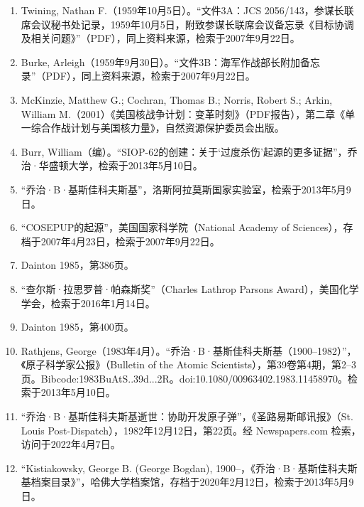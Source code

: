 \begin{enumerate}
\item Twining, Nathan F.（1959年10月5日）。“文件3A：JCS 2056/143，参谋长联席会议秘书处记录，1959年10月5日，附致参谋长联席会议备忘录《目标协调及相关问题》”（PDF），同上资料来源，检索于2007年9月22日。
\item Burke, Arleigh（1959年9月30日）。“文件3B：海军作战部长附加备忘录”（PDF），同上资料来源，检索于2007年9月22日。
\item McKinzie, Matthew G.; Cochran, Thomas B.; Norris, Robert S.; Arkin, William M.（2001）《美国核战争计划：变革时刻》（PDF报告），第二章《单一综合作战计划与美国核力量》，自然资源保护委员会出版。
\item Burr, William（编）。“SIOP-62的创建：关于‘过度杀伤’起源的更多证据”，乔治·华盛顿大学，检索于2013年5月10日。
\item “乔治·B·基斯佳科夫斯基”，洛斯阿拉莫斯国家实验室，检索于2013年5月9日。
\item “COSEPUP的起源”，美国国家科学院（National Academy of Sciences），存档于2007年4月23日，检索于2007年9月22日。
\item Dainton 1985，第386页。
\item “查尔斯·拉思罗普·帕森斯奖”（Charles Lathrop Parsons Award），美国化学学会，检索于2016年1月14日。
\item Dainton 1985，第400页。
\item Rathjens, George（1983年4月）。“乔治·B·基斯佳科夫斯基（1900–1982）”，《原子科学家公报》（Bulletin of the Atomic Scientists），第39卷第4期，第2–3页。Bibcode:1983BuAtS..39d...2R。doi:10.1080/00963402.1983.11458970。检索于2013年5月10日。
\item “乔治·B·基斯佳科夫斯基逝世：协助开发原子弹”，《圣路易斯邮讯报》（St. Louis Post-Dispatch），1982年12月12日，第22页。经 Newspapers.com 检索，访问于2022年4月7日。
\item “Kistiakowsky, George B. (George Bogdan), 1900–，《乔治·B·基斯佳科夫斯基档案目录》”，哈佛大学档案馆，存档于2020年2月12日，检索于2013年5月9日。
\end{enumerate}